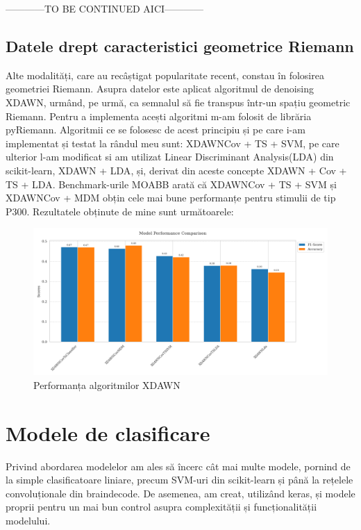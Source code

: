 ------------TO BE CONTINUED AICI------------

\subsection{Datele drept caracteristici geometrice Riemann}
Alte modalități, care au recâștigat popularitate recent, constau în folosirea geometriei Riemann. Asupra datelor este aplicat algoritmul de denoising XDAWN\cite{xdawn}, urmând, pe urmă, ca semnalul să fie transpus într-un spațiu geometric Riemann. Pentru a implementa acești algoritmi m-am folosit de librăria pyRiemann\cite{pyriemann}. Algoritmii ce se folosesc de acest principiu și pe care i-am implementat și testat la rândul meu sunt: XDAWNCov + TS + SVM\cite{xdawncovtssvm}, pe care ulterior l-am modificat si am utilizat Linear Discriminant Analysis(LDA) din scikit-learn, XDAWN + LDA\cite{xdawnlda}, și, derivat din aceste concepte XDAWN + Cov + TS + LDA. Benchmark-urile MOABB\cite{moabb}  arată că XDAWNCov + TS + SVM și XDAWNCov + MDM obțin cele mai bune performanțe pentru stimulii de tip P300. Rezultatele obținute de mine sunt următoarele:

\vspace{1em}
\begin{figure}[h]
    \centering
    \includegraphics[width=1\linewidth]{comparison_xdawn.png}
    \caption{Performanța algoritmilor XDAWN}
    \label{fig:enter-label}
\end{figure}

\section{Modele de clasificare}
Privind abordarea modelelor am ales să încerc cât mai multe modele, pornind de la simple clasificatoare liniare, precum SVM-uri din scikit-learn\cite{scikit-learn} și până la rețelele convoluționale din braindecode\cite{braindecode}. De asemenea, am creat, utilizând keras\cite{keras}, și modele proprii pentru un mai bun control asupra complexității și funcționalității modelului.
